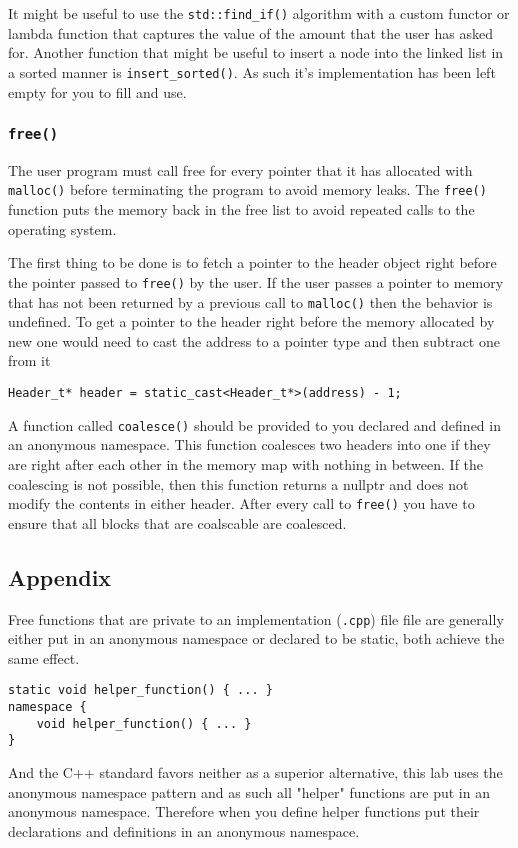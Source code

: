 \documentclass{article}
\begin{document}
It might be useful to use the \texttt{std::find\_if()} algorithm with a custom
functor or lambda function that captures the value of the amount that the user
has asked for.  Another function that might be useful to insert a node into
the linked list in a sorted manner is \texttt{insert\_sorted()}.  As such it's
implementation has been left empty for you to fill and use.

\subsubsection{\texttt{free()}}
The user program must call free for every pointer that it has allocated with
\texttt{malloc()} before terminating the program to avoid memory leaks.  The
\texttt{free()} function puts the memory back in the free list to avoid
repeated calls to the operating system.

The first thing to be done is to fetch a pointer to the header object right
before the pointer passed to \texttt{free()} by the user.  If the user passes
a pointer to memory that has not been returned by a previous call to
\texttt{malloc()} then the behavior is undefined.  To get a pointer to the
header right before the memory allocated by new one would need to cast the
address to a pointer type and then subtract one from it
\begin{lstlisting}
Header_t* header = static_cast<Header_t*>(address) - 1;
\end{lstlisting}

A function called \texttt{coalesce()} should be provided to you declared and
defined in an anonymous namespace.  This function coalesces two headers into
one if they are right after each other in the memory map with nothing in
between.  If the coalescing is not possible, then this function returns a
nullptr and does not modify the contents in either header.  After every call
to \texttt{free()} you have to ensure that all blocks that are coalscable are
coalesced.

\subsection{Appendix}
Free functions that are private to an implementation (\texttt{.cpp}) file file
are generally either put in an anonymous namespace or declared to be static,
both achieve the same effect.
\begin{lstlisting}
static void helper_function() { ... }
namespace {
    void helper_function() { ... }
}
\end{lstlisting}

And the C++ standard favors neither as a superior alternative, this lab uses
the anonymous namespace pattern and as such all "helper" functions are put in
an anonymous namespace.  Therefore when you define helper functions put their
declarations and definitions in an anonymous namespace.
\end{document}
